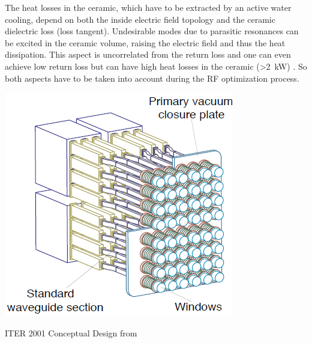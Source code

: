 {The heat losses in the ceramic, which have to be extracted by an active water cooling, depend on both the inside electric field topology and the ceramic dielectric loss (loss tangent). Undesirable modes due to parasitic resonances can be excited in the ceramic volume, raising the electric field and thus the heat dissipation. This aspect is uncorrelated from the return loss and one can even achieve low return loss but can have high heat losses in the ceramic (>2~\si{kW}) . So both aspects have to be taken into account during the RF optimization process.


\begin{marginfigure}
	\centering
	\includegraphics[width=1.0\linewidth]{figures/chap3/ITER_antenna/ITER_LH_antenna_old}
	\caption{ITER 2001 Conceptual Design from \cite{bibet2001-1}}
	\label{fig:iterlhantennaold}
\end{marginfigure}


}
